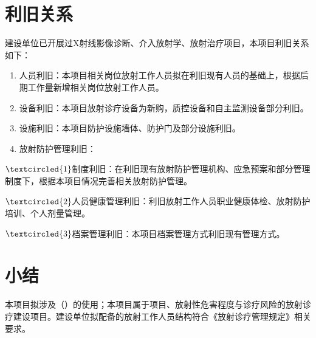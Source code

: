\section{利旧关系}

建设单位已开展过X射线影像诊断、介入放射学、放射治疗项目，本项目利旧关系如下：

\begin{enumerate}
\item 人员利旧：本项目相关岗位放射工作人员拟在利旧现有人员的基础上，根据后期工作量新增相关岗位放射工作人员。
\item 设备利旧：本项目放射诊疗设备为新购，质控设备和自主监测设备部分利旧。
\item 设施利旧：本项目防护设施墙体、防护门及部分设施利旧。
\item 放射防护管理利旧：
\end{enumerate}

$\textcircled{1}$制度利旧：在利旧现有放射防护管理机构、应急预案和部分管理制度下，根据本项目情况完善相关放射防护管理。

$\textcircled{2}$人员健康管理利旧：利旧放射工作人员职业健康体检、放射防护培训、个人剂量管理。

$\textcircled{3}$档案管理利旧：本项目档案管理方式利旧现有管理方式。

\section{小结}

本项目拟涉及\sourcetype（\sourcesummary）的使用；本项目属于\projectnature 项目、放射性危害程度与诊疗风险\textbf{\radiationhazarddegree}的放射诊疗建设项目。建设单位拟配备的放射工作人员结构符合《放射诊疗管理规定》相关要求。
